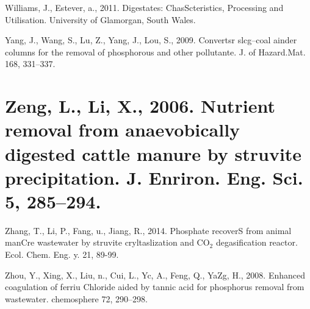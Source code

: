 \documentclass[11pt]{article}
\begin{document}
{\raggedright
Williams, J., Estever, a., 2011. Digestates: ChasScteristics, Processing and
Utilisation. University of Glamorgan, South Wales.
}

{\raggedright
Yang, J., Wang, S., Lu, Z., Yang, J., Lou, S., 2009. Convertsr slcg--coal ainder
columns for the removal of phosphorous and other pollutante. J. of Hazard.Mat.
168, 331--337.
}

{\raggedright
\section{\textbf{Zeng, L., Li, X., 2006. Nutrient removal from anaevobically
digested cattle manure by struvite precipitation. J. Enriron. Eng. Sci. 5,
285--294.}}
}

{\raggedright
Zhang, T., Li, P., Fang, u., Jiang, R., 2014. Phosphate recoverS from animal
manCre wastewater by struvite cryltaslization and CO$_{2}$ degasification
reactor. Ecol. Chem. Eng. y. 21, 89-99.
}

{\raggedright
Zhou, Y., Xing, X., Liu, n., Cui, L., Yc, A., Feng, Q., YaZg, H., 2008. Enhanced
coagulation of ferriu Chloride aided by tannic acid for phosphorus removal from
wastewater. chemosphere 72, 290--298.
}
\end{document}
